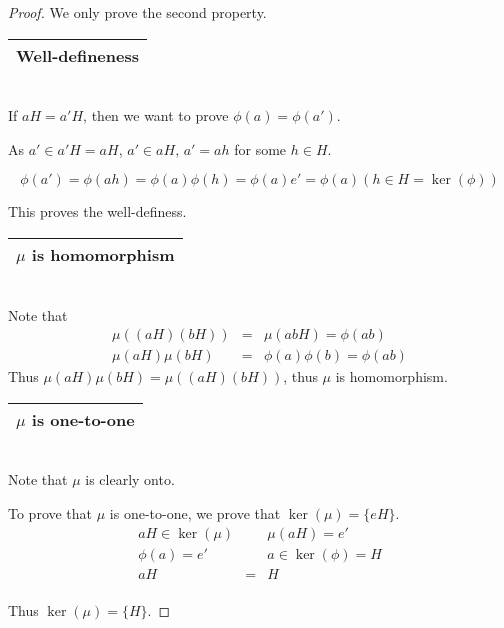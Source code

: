 \documentclass{article}
\theoremstyle{MyNonumberplain}
\theoremstyle{break}
\newtheorem*{proof}{Proof. }
\newcommand{\p}{\phi}
\theoremstyle{break}
\theoremstyle{break}
\theoremstyle{definition}
\theoremstyle{break}
\begin{document}
\begin{thmbox}
    \begin{prfbox}
        \begin{proof}
            We only prove the second property.\bigskip

            \begin{tabular}{|c|}
            \hline
            Well-defineness\\
            \hline
            \end{tabular}\\

            If $a H = a' H$, then we want to prove $\p (a) = \p (a')$.\bigskip

            As $a' \in a' H = a H$, $a' \in a H$, $a' = a h$ for some $h \in H$.

            $$\p (a') = \p (a h) = \p (a) \p (h) = \p (a) e' = \p (a) \left( h \in H =
            \ker \left( \p \right) \right)$$

            This proves the well-definess.\bigskip

            \begin{tabular}{|c|}
            \hline
            $\mu$ is homomorphism\\
            \hline
            \end{tabular}\\

            Note that
            \begin{eqnarray*}
            \mu ( (a H) (b H)) & = & \mu (a b H) = \p (a b)\\
            \mu (a H) \mu (b H) & = & \p (a) \p (b) = \p (a b)
            \end{eqnarray*}
            Thus $\mu (a H) \mu (b H) = \mu ( (a H) (b H))$, thus $\mu$ is homomorphism.\bigskip

            \begin{tabular}{|c|}
            \hline
            $\mu$ is one-to-one\\
            \hline
            \end{tabular}\\

            Note that $\mu$ is clearly onto.\bigskip

            To prove that $\mu$ is one-to-one, we prove that $\ker (\mu) = \{ e H \}$.\bigskip
            \begin{eqnarray*}
            a H \in \ker (\mu) &  & \mu (a H) = e'\\
            \p (a) = e' &  & a \in \ker \left( \p \right) = H\\
            a H & = & H
            \end{eqnarray*}\\
            Thus $\ker (\mu) = \{ H \}$.
        \end{proof}
    \end{prfbox}
\end{thmbox}
\end{document}
